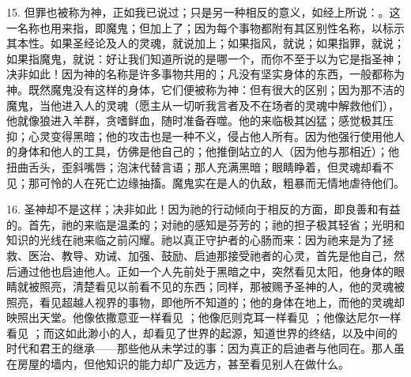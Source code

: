 15. 但罪也被称为神，正如我已说过；只是另一种相反的意义，如经上所说：。这一名称也用来指，即魔鬼；但加上了；因为每个事物都附有其区别性名称，以标示其本性。如果圣经论及人的灵魂，就说加上；如果指风，就说；如果指罪，就说；如果指魔鬼，就说：好让我们知道所说的是哪一个，而你不至于以为它是指圣神；决非如此！因为神的名称是许多事物共用的；凡没有坚实身体的东西，一般都称为神。既然魔鬼没有这样的身体，它们便被称为神：但有很大的区别；因为那不洁的魔鬼，当他进入人的灵魂（愿主从一切听我言者及不在场者的灵魂中解救他们），他就像狼进入羊群，贪嗜鲜血，随时准备吞噬。他的来临极其凶猛；感觉极其压抑；心灵变得黑暗；他的攻击也是一种不义，侵占他人所有。因为他强行使用他人的身体和他人的工具，仿佛是他自己的；他推倒站立的人（因为他与那相近）；他扭曲舌头，歪斜嘴唇；泡沫代替言语；那人充满黑暗；眼睛睁着，但灵魂却看不见；那可怜的人在死亡边缘抽搐。魔鬼实在是人的仇敌，粗暴而无情地虐待他们。\par

16. 圣神却不是这样；决非如此！因为祂的行动倾向于相反的方面，即良善和有益的。首先，祂的来临是温柔的；对祂的感知是芬芳的；祂的担子极其轻省；光明和知识的光线在祂来临之前闪耀。祂以真正守护者的心肠而来：因为祂来是为了拯救、医治、教导、劝诫、加强、鼓励、启迪那接受祂者的心灵，首先是他自己，然后通过他也启迪他人。正如一个人先前处于黑暗之中，突然看见太阳，他身体的眼睛就被照亮，清楚看见以前看不见的东西；同样，那被赐予圣神的人，他的灵魂被照亮，看见超越人视界的事物，即他所不知道的；他的身体在地上，而他的灵魂却映照出天堂。他像依撒意亚一样看见 ；他像厄则克耳一样看见 ；他像达尼尔一样看见 ；而这如此渺小的人，却看见了世界的起源，知道世界的终结，以及中间的时代和君王的继承——那些他从未学过的事：因为真正的启迪者与他同在。那人虽在房屋的墙内，但他知识的能力却广及远方，甚至看见别人在做什么。\par

